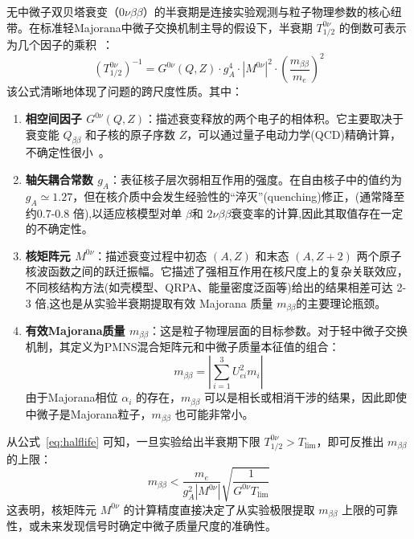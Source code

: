 \documentclass[12pt,a4paper]{ctexart}
\begin{document}
无中微子双贝塔衰变（$0\nu\beta\beta$）的半衰期是连接实验观测与粒子物理参数的核心纽带。在标准轻Majorana中微子交换机制主导的假设下，半衰期 $T_{1/2}^{0\nu}$ 的倒数可表示为几个因子的乘积~\cite{GomezCadenas2023,Engel2017}：
\begin{equation}
\left(T_{1/2}^{0\nu}\right)^{-1} = G^{0\nu}(Q,Z) \cdot g_A^4 \cdot \left| M^{0\nu} \right|^2 \cdot \left( \frac{m_{\beta\beta}}{m_e} \right)^2 \label{eq:halflife}
\end{equation}
该公式清晰地体现了问题的跨尺度性质。其中：
\begin{enumerate}
\item \textbf{相空间因子 $G^{0\nu}(Q,Z)$}：描述衰变释放的两个电子的相体积。它主要取决于衰变能 $Q_{\beta\beta}$ 和子核的原子序数 $Z$，可以通过量子电动力学(QCD)精确计算，不确定性很小~\cite{GomezCadenas2023}。
\item \textbf{轴矢耦合常数 $g_A$}：表征核子层次弱相互作用的强度。在自由核子中的值约为 $g_A \simeq 1.27$，但在核介质中会发生经验性的“淬灭”(quenching)修正，(通常降至约0.7-0.8 倍),以适应核模型对单 $\beta$和 $2\nu\beta\beta$衰变率的计算,因此其取值存在一定的不确定性。
\item \textbf{核矩阵元 $M^{0\nu}$}：描述衰变过程中初态 $(A,Z)$ 和末态 $(A,Z+2)$ 两个原子核波函数之间的跃迁振幅。它描述了强相互作用在核尺度上的复杂关联效应，不同核结构方法(如壳模型、QRPA、能量密度泛函等)给出的结果相差可达 2-3 倍,这也是从实验半衰期提取有效 Majorana 质量 $m_{\beta\beta}$的主要理论瓶颈。

\item \textbf{有效Majorana质量 $m_{\beta\beta}$}：这是粒子物理层面的目标参数。对于轻中微子交换机制，其定义为PMNS混合矩阵元和中微子质量本征值的组合：
\begin{equation}
m_{\beta\beta} = \left| \sum_{i=1}^{3} U_{ei}^2 m_i \right| \label{eq:meff}
\end{equation}
由于Majorana相位 $\alpha_i$ 的存在，$m_{\beta\beta}$ 可以是相长或相消干涉的结果，因此即使中微子是Majorana粒子，$m_{\beta\beta}$ 也可能非常小。
\end{enumerate}
从公式~\eqref{eq:halflife} 可知，一旦实验给出半衰期下限 $T_{1/2}^{0\nu} > T_{\mathrm{lim}}$，即可反推出 $m_{\beta\beta}$ 的上限：
\begin{equation}
m_{\beta\beta} < \frac{m_e}{g_A^2 |M^{0\nu}|} \sqrt{\frac{1}{G^{0\nu} T_{\mathrm{lim}}}} \label{eq:mlimit}
\end{equation}
这表明，核矩阵元 $M^{0\nu}$ 的计算精度直接决定了从实验极限提取 $m_{\beta\beta}$ 上限的可靠性，或未来发现信号时确定中微子质量尺度的准确性。
\end{document}
